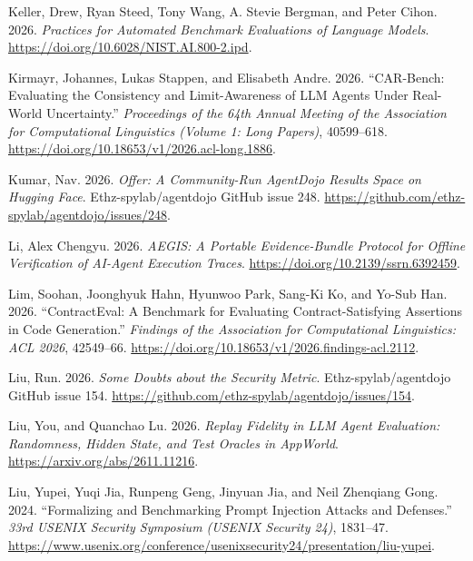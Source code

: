 \documentclass[
  american,
  10pt,
  a4paper,
]{article}
\newlength{\cslhangindent}
\newenvironment{CSLReferences}[2] %
 {\begin{list}{}{%
  \setlength{\itemindent}{0pt}
  \setlength{\leftmargin}{0pt}
  \setlength{\parsep}{0pt}
  \ifodd #1
   \setlength{\leftmargin}{\cslhangindent}
   \setlength{\itemindent}{-1\cslhangindent}
  \fi
  \setlength{\itemsep}{#2\baselineskip}}}
 {\end{list}}
\begin{document}
\begin{CSLReferences}{1}{1}
Keller, Drew, Ryan Steed, Tony Wang, A. Stevie Bergman, and Peter Cihon.
2026. \emph{Practices for Automated Benchmark Evaluations of Language
Models}. \url{https://doi.org/10.6028/NIST.AI.800-2.ipd}.

Kirmayr, Johannes, Lukas Stappen, and Elisabeth Andre. 2026.
{``{CAR}-Bench: Evaluating the Consistency and Limit-Awareness of {LLM}
Agents Under Real-World Uncertainty.''} \emph{Proceedings of the 64th
Annual Meeting of the Association for Computational Linguistics (Volume
1: Long Papers)}, 40599--618.
\url{https://doi.org/10.18653/v1/2026.acl-long.1886}.

Kumar, Nav. 2026. \emph{Offer: A Community-Run {AgentDojo} Results Space
on Hugging Face}. Ethz-spylab/agentdojo GitHub issue 248.
\url{https://github.com/ethz-spylab/agentdojo/issues/248}.

Li, Alex Chengyu. 2026. \emph{AEGIS: A Portable Evidence-Bundle Protocol
for Offline Verification of AI-Agent Execution Traces}.
\url{https://doi.org/10.2139/ssrn.6392459}.

Lim, Soohan, Joonghyuk Hahn, Hyunwoo Park, Sang-Ki Ko, and Yo-Sub Han.
2026. {``ContractEval: A Benchmark for Evaluating Contract-Satisfying
Assertions in Code Generation.''} \emph{Findings of the Association for
Computational Linguistics: ACL 2026}, 42549--66.
\url{https://doi.org/10.18653/v1/2026.findings-acl.2112}.

Liu, Run. 2026. \emph{Some Doubts about the Security Metric}.
Ethz-spylab/agentdojo GitHub issue 154.
\url{https://github.com/ethz-spylab/agentdojo/issues/154}.

Liu, You, and Quanchao Lu. 2026. \emph{Replay Fidelity in {LLM} Agent
Evaluation: Randomness, Hidden State, and Test Oracles in {AppWorld}}.
\url{https://arxiv.org/abs/2611.11216}.

Liu, Yupei, Yuqi Jia, Runpeng Geng, Jinyuan Jia, and Neil Zhenqiang
Gong. 2024. {``Formalizing and Benchmarking Prompt Injection Attacks and
Defenses.''} \emph{33rd USENIX Security Symposium (USENIX Security 24)},
1831--47.
\url{https://www.usenix.org/conference/usenixsecurity24/presentation/liu-yupei}.


\end{CSLReferences}
\end{document}
